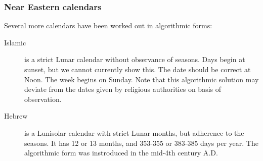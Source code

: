 \subsubsection{Near Eastern calendars}
Several more calendars have been worked out in algorithmic forms:
\begin{description}
\item[Islamic] is a strict Lunar calendar without observance of
  seasons. Days begin at sunset, but we cannot currently show
  this. The date should be correct at Noon. The week begins on
  Sunday. Note that this algorithmic solution may deviate from the
  dates given by religious authorities on basis of observation.
\item[Hebrew] is a Lunisolar calendar with strict Lunar months, but
  adherence to the seasons. It has 12 or 13 months, and 353-355 or
  383-385 days per year. The algorithmic form was instroduced in the
  mid-4th century A.D.
\end{description}


